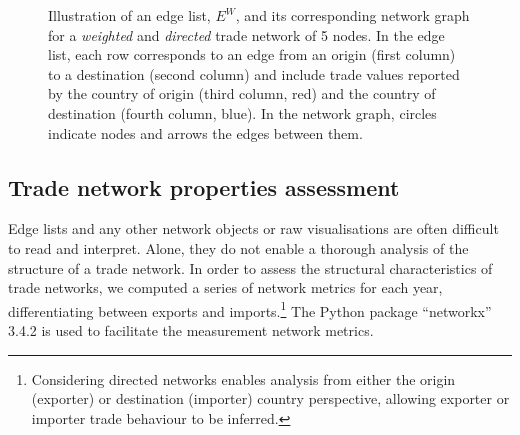 \documentclass[
  authoryear,
  review,
  3p]{elsarticle}
\begin{document}
\begin{figure}[t]


\caption{\label{fig-edge-list-weighted}Illustration of an edge list,
\(E^W\), and its corresponding network graph for a \textit{weighted} and
\textit{directed} trade network of 5 nodes. In the edge list, each row
corresponds to an edge from an origin (first column) to a destination
(second column) and include trade values reported by the country of
origin (third column, red) and the country of destination (fourth
column, blue). In the network graph, circles indicate nodes and arrows
the edges between them.}

\end{figure}%

\subsection{Trade network properties
assessment}\label{trade-network-properties-assessment}

Edge lists and any other network objects or raw visualisations are often
difficult to read and interpret. Alone, they do not enable a thorough
analysis of the structure of a trade network. In order to assess the
structural characteristics of trade networks, we computed a series of
network metrics for each year, differentiating between exports and
imports.\footnote{Considering directed networks enables analysis from
  either the origin (exporter) or destination (importer) country
  perspective, allowing exporter or importer trade behaviour to be
  inferred.} The Python package ``networkx'' 3.4.2
\citep{SciPyProceedings_11} is used to facilitate the measurement
network metrics.
\end{document}
